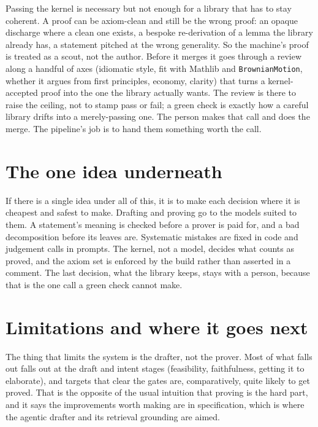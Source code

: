 \documentclass[11pt]{article}
\newcommand{\lean}[1]{\texttt{\def\_{\textunderscore\allowbreak}#1}}
\begin{document}
Passing the kernel is necessary but not enough for a library that has to stay coherent. A
proof can be axiom-clean and still be the wrong proof: an opaque discharge where a clean
one exists, a bespoke re-derivation of a lemma the library already has, a statement pitched
at the wrong generality. So the machine's proof is treated as a scout, not the author.
Before it merges it goes through a review along a handful of axes (idiomatic style, fit
with Mathlib and \lean{BrownianMotion}, whether it argues from first principles, economy,
clarity) that turns a kernel-accepted proof into the one the library actually wants. The
review is there to raise the ceiling, not to stamp pass or fail; a green check is exactly
how a careful library drifts into a merely-passing one. The person makes that call and
does the merge. The pipeline's job is to hand them something worth the call.

\section{The one idea underneath}\label{sec:principles}

If there is a single idea under all of this, it is to make each decision where it is
cheapest and safest to make. Drafting and proving go to the models suited to them. A
statement's meaning is checked before a prover is paid for, and a bad decomposition before
its leaves are. Systematic mistakes are fixed in code and judgement calls in prompts. The
kernel, not a model, decides what counts as proved, and the axiom set is enforced by the
build rather than asserted in a comment. The last decision, what the library keeps, stays
with a person, because that is the one call a green check cannot make.

\section{Limitations and where it goes next}\label{sec:limits}

The thing that limits the system is the drafter, not the prover. Most of what falls out
falls out at the draft and intent stages (feasibility, faithfulness, getting it to
elaborate), and targets that clear the gates are, comparatively, quite likely to get
proved. That is the opposite of the usual intuition that proving is the hard part, and it
says the improvements worth making are in specification, which is where the agentic
drafter and its retrieval grounding are aimed.
\end{document}
